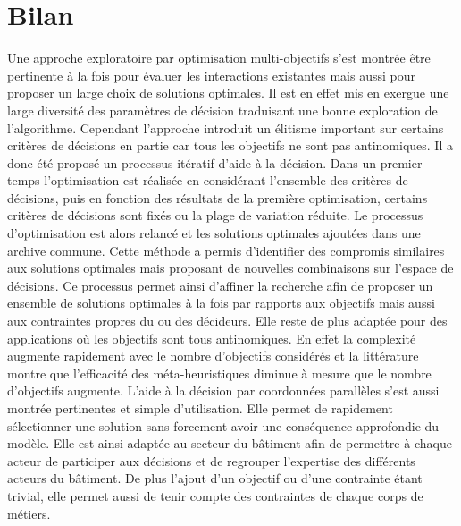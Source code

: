 \section{Bilan} %
\label{sec:bilan_aide_decision}
Une approche exploratoire par optimisation multi-objectifs s’est montrée être pertinente à
la fois pour évaluer les interactions existantes mais aussi pour proposer un large choix
de solutions optimales. Il est en effet mis en exergue une large diversité des paramètres
de décision traduisant une bonne exploration de l’algorithme. Cependant l’approche
introduit un élitisme important sur certains critères de décisions en partie car tous les
objectifs ne sont pas antinomiques. Il a donc été proposé un processus itératif d’aide à
la décision. Dans un premier temps l’optimisation est réalisée en considérant l’ensemble
des critères de décisions, puis en fonction des résultats de la première optimisation,
certains critères de décisions sont fixés ou la plage de variation réduite. Le processus
d’optimisation est alors relancé et les solutions optimales ajoutées dans une archive
commune. Cette méthode a permis d’identifier des compromis similaires aux solutions
optimales mais proposant de nouvelles combinaisons sur l’espace de décisions. Ce processus
permet ainsi d’affiner la recherche afin de proposer un ensemble de solutions optimales à
la fois par rapports aux objectifs mais aussi aux contraintes propres du ou des décideurs.
Elle reste de plus adaptée pour des applications où les objectifs sont tous antinomiques.
En effet la complexité augmente rapidement avec le nombre d’objectifs considérés et la
littérature montre que l’efficacité des méta-heuristiques diminue à mesure que le
nombre d’objectifs augmente. L’aide à la décision par coordonnées parallèles s’est aussi
montrée pertinentes et simple d’utilisation. Elle permet de rapidement sélectionner une
solution sans forcement avoir une conséquence approfondie du modèle. Elle est ainsi
adaptée au secteur du bâtiment afin de permettre à chaque acteur de participer aux
décisions et de regrouper l’expertise des différents acteurs du bâtiment. De plus l’ajout d’un objectif
ou d’une contrainte étant trivial, elle permet aussi de tenir compte des contraintes de chaque corps de métiers.

